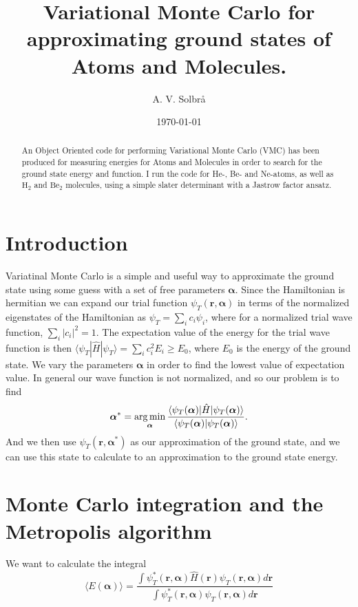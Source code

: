 \documentclass[aps,prc,twocolumn,floatfix]{revtex4}
\def\rvec{\textbf{r}}
\def\alphavec{\boldsymbol\alpha}
\begin{document}
\title{Variational Monte Carlo for approximating ground states of Atoms and Molecules.}
\author{A. V. Solbr\aa}

\date{\today}
\begin{abstract}
An Object Oriented code for performing Variational Monte Carlo (VMC) has been produced for measuring energies for Atoms and Molecules in order to search for the ground state energy and function. I run the code for He-, Be- and Ne-atoms, as well as $\text{H}_2$ and $\text{Be}_2$ molecules, using a simple slater determinant with a Jastrow factor ansatz. 
\end{abstract}

\maketitle

\section{Introduction}
\label{sec:introduction}
Variatinal Monte Carlo is a simple and useful way to approximate the ground state using some guess with a set of free parameters $\alphavec$. Since the Hamiltonian is hermitian we can expand our trial function $\psi_T(\rvec, \alphavec)$ in terms of the normalized eigenstates of the Hamiltonian as $\psi_T = \sum_i c_i \psi_i$, where for a normalized trial wave function, $\sum_i |c_i|^2  = 1$. The expectation value of the energy for the trial wave function is then $\langle \psi_T | \hat{H} | \psi_T \rangle = \sum_i c_i^2 E_i \ge E_0$, where $E_0$ is the energy of the ground state. We vary the parameters $\alphavec$ in order to find the lowest value of expectation value. In general our wave function is not normalized, and so our problem is to find \begin{equation}
\alphavec^* = \underset{\alphavec}{\operatorname{arg\,min}}\, {\langle \psi_T(\alphavec) | \hat{H} | \psi_T(\alphavec) \rangle \over \langle \psi_T(\alphavec) | \psi_T(\alphavec) \rangle }.
\end{equation}
And we then use $\psi_T(\rvec, \alphavec^*)$ as our approximation of the ground state, and we can use this state to calculate to an approximation to the ground state energy. 

\section{Monte Carlo integration and the Metropolis algorithm}
\label{sec:metro}
We want to calculate the integral 
\begin{equation}
 \langle E(\alphavec) \rangle = \frac{\int \psi^{\ast}_T(\rvec, \alphavec)\hat{H}(\rvec)\psi_T(\rvec, \alphavec) d\rvec} {\int\psi^{\ast}_T(\rvec, \alphavec)\psi_T(\rvec, \alphavec) d\rvec }
\end{equation}
\end{document}
